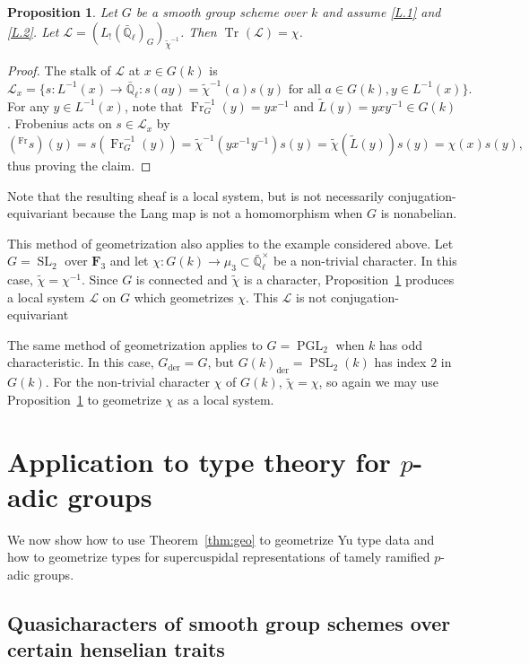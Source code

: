 \documentclass[10pt]{amsart}
\theoremstyle{plain}
\newtheorem{proposition}[theorem]{Proposition}
\theoremstyle{definition}
\newcommand{\FFF}{{\mathbf{F}_3}}
\newcommand{\EE}{\mathbb{\bar Q}_\ell}
\newcommand{\EEx}{\EE^\times}
\newcommand{\Frob}[1]{\operatorname{Fr}_{#1}}
\DeclareMathOperator{\SL}{SL}
\DeclareMathOperator{\PGL}{PGL}
\DeclareMathOperator{\PSL}{PSL}
\newcommand{\der}{_{\operatorname{der}}}
\DeclareMathOperator{\Tr}{Tr}
\newcommand{\TrFrob}[1]{\Tr_{#1}}
\newcommand{\cs}[1]{{\mathcal{#1}}}
\begin{document}
\begin{proposition}\label{prop:chitilde}
Let $G$ be a smooth group scheme over $k$ and assume \ref{L.1} and \ref{L.2}.  Let $\cs{L} = (L_!(\EE)_G)_{\tilde{\chi}^{-1}}$.  Then $\TrFrob{}(\cs{L}) = \chi$.
\end{proposition}
\begin{proof}
The stalk of $\cs{L}$ at $x \in G(k)$ is
\[
\cs{L}_x = \{ s : L^{-1}(x) \to \EE : s(ay) = \tilde{\chi}^{-1}(a) s(y) \mbox{ for all $a \in G(k), y \in L^{-1}(x)$}\}.
\]
For any $y \in L^{-1}(x)$, note that $\Frob{G}^{-1}(y) = yx^{-1}$ and $\tilde{L}(y) = yxy^{-1} \in G(k)$.  Frobenius acts on $s \in \cs{L}_x$ by
\[
(^{\Frob{}}s)(y) = s(\Frob{G}^{-1}(y)) = \tilde{\chi}^{-1}(yx^{-1}y^{-1})s(y) = \tilde{\chi}(\tilde{L}(y))s(y) = \chi(x)s(y),
\]
thus proving the claim.
\end{proof}

Note that the resulting sheaf is a local system, but is not necessarily conjugation-equivariant because
the Lang map is not a homomorphism when $G$ is nonabelian.

This method of geometrization also applies to the example considered above.
Let $G = \SL_2$ over $\FFF$ and let $\chi : G(k) \to \mu_3 \subset \EEx$ be a non-trivial character.
In this case, $\tilde{\chi}= \chi^{-1}$. 
Since $G$ is connected and $\tilde{\chi}$ is a character, Proposition~\ref{prop:chitilde} produces a local system $\cs{L}$ on $G$ which geometrizes $\chi$.
This $\cs{L}$ is not conjugation-equivariant 

The same method of geometrization applies to $G = \PGL_2$ when $k$ has odd characteristic.
In this case, $G\der = G$, but $G(k)\der = \PSL_2(k)$ has index $2$ in $G(k)$.
For the non-trivial character $\chi$ of $G(k)$, $\tilde{\chi} = \chi$, so again we may use Proposition~\ref{prop:chitilde} to geometrize $\chi$ as a local system. 

\section{Application to type theory for \texorpdfstring{$p$}{p}-adic groups}\label{sec:types}

We now show how to use Theorem~\ref{thm:geo} to geometrize Yu type data and how to geometrize types for supercuspidal representations of tamely ramified $p$-adic groups.

\subsection{Quasicharacters of smooth group schemes over certain henselian traits}\label{ssec:quasicharacters}
\end{document}
